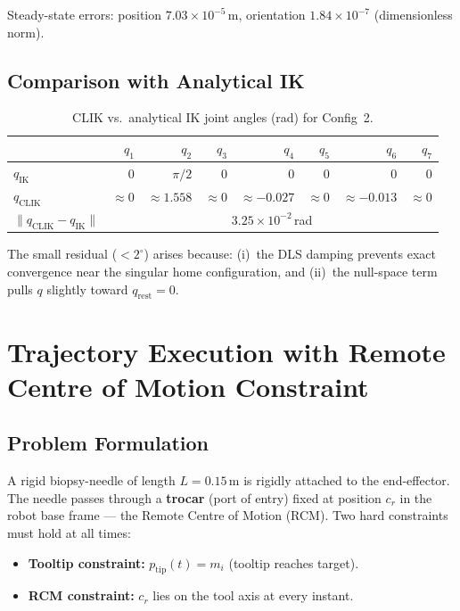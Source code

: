 \documentclass[11pt,a4paper]{article}
\begin{document}
Steady-state errors: position $7.03\times10^{-5}$\,m,
orientation $1.84\times10^{-7}$ (dimensionless norm).

\subsection{Comparison with Analytical IK}
\begin{table}[H]
  \centering
  \caption{CLIK vs.\ analytical IK joint angles (rad) for Config~2.}
  \begin{tabular}{lrrrrrrr}
    \toprule
     & $q_1$ & $q_2$ & $q_3$ & $q_4$ & $q_5$ & $q_6$ & $q_7$ \\
    \midrule
    $q_{\mathrm{IK}}$   & 0 & $\pi/2$ & 0 & 0 & 0 & 0 & 0 \\
    $q_{\mathrm{CLIK}}$ & $\approx0$ & $\approx1.558$ & $\approx0$ & $\approx-0.027$ & $\approx0$ & $\approx-0.013$ & $\approx0$ \\
    \midrule
    $\|q_{\mathrm{CLIK}}-q_{\mathrm{IK}}\|$ & \multicolumn{7}{c}{$3.25\times10^{-2}$\,rad} \\
    \bottomrule
  \end{tabular}
\end{table}

The small residual ($<2^{\circ}$) arises because: (i)~the DLS damping prevents
exact convergence near the singular home configuration, and (ii)~the
null-space term pulls $q$ slightly toward $q_{\mathrm{rest}}=0$.

\section{Trajectory Execution with Remote Centre of Motion Constraint}

\subsection{Problem Formulation}

A rigid biopsy-needle of length $L=0.15$\,m is rigidly attached to the
end-effector. The needle passes through a \textbf{trocar} (port of entry) fixed
at position $c_r$ in the robot base frame — the Remote Centre of Motion (RCM).
Two hard constraints must hold at all times:
\begin{itemize}
  \item \textbf{Tooltip constraint:} $p_{\mathrm{tip}}(t)=m_i$ (tooltip reaches target).
  \item \textbf{RCM constraint:} $c_r$ lies on the tool axis at every instant.
\end{itemize}
\end{document}

